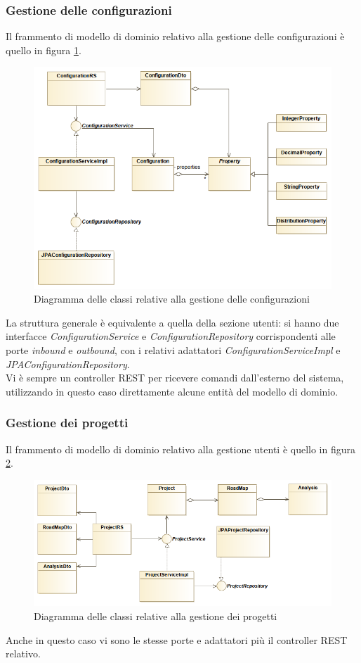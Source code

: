 \subsubsection{Gestione delle configurazioni}
Il frammento di modello di dominio relativo alla gestione delle configurazioni è quello in figura \ref{fig:configurations_diagram}.

\begin{figure}[h]
	\centering
	\includegraphics[width=\textwidth]{img/configurations_diagram}
	\caption{Diagramma delle classi relative alla gestione delle configurazioni}
	\label{fig:configurations_diagram}
\end{figure}

La struttura generale è equivalente a quella della sezione utenti: si hanno due interfacce \textit{ConfigurationService} e \textit{ConfigurationRepository} corrispondenti alle porte \textit{inbound} e \textit{outbound}, con i relativi adattatori \textit{ConfigurationServiceImpl} e \textit{JPAConfigurationRepository}.\\
Vi è sempre un controller REST per ricevere comandi dall'esterno del sistema, utilizzando in questo caso direttamente alcune entità del modello di dominio.

\subsubsection{Gestione dei progetti}
Il frammento di modello di dominio relativo alla gestione utenti è quello in figura \ref{fig:projects_diagram}.

\begin{figure}[h]
	\centering
	\includegraphics[width=\textwidth]{img/projects_diagram}
	\caption{Diagramma delle classi relative alla gestione dei progetti}
	\label{fig:projects_diagram}
\end{figure}

Anche in questo caso vi sono le stesse porte e adattatori più il controller REST relativo.
